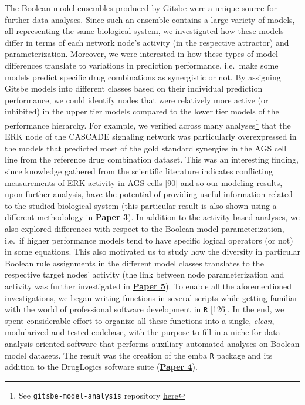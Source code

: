 \documentclass[
  12pt,
]{book}
\begin{document}
The Boolean model ensembles produced by Gitsbe were a unique source for further data analyses.
Since such an ensemble contains a large variety of models, all representing the same biological system, we investigated how these models differ in terms of each network node's activity (in the respective attractor) and parameterization.
Moreover, we were interested in how these types of model differences translate to variations in prediction performance, i.e.~make some models predict specific drug combinations as synergistic or not.
By assigning Gitsbe models into different classes based on their individual prediction performance, we could identify nodes that were relatively more active (or inhibited) in the upper tier models compared to the lower tier models of the performance hierarchy.
For example, we verified across many analyses\footnote{See \texttt{gitsbe-model-analysis} repository \protect\hyperlink{misc-links}{here}} that the ERK node of the CASCADE signaling network was particularly overexpressed in the models that predicted most of the gold standard synergies in the AGS cell line from the reference drug combination dataset.
This was an interesting finding, since knowledge gathered from the scientific literature indicates conflicting measurements of ERK activity in AGS cells {[}\protect\hyperlink{ref-Flobak2015}{90}{]} and so our modeling results, upon further analysis, have the potential of providing useful information related to the studied biological system (this particular result is also shown using a different methodology in \textbf{\protect\hyperlink{Paper3}{Paper 3}}).
In addition to the activity-based analyses, we also explored differences with respect to the Boolean model parameterization, i.e.~if higher performance models tend to have specific logical operators (or not) in some equations.
This also motivated us to study how the diversity in particular Boolean rule assignments in the different model classes translates to the respective target nodes' activity (the link between node parameterization and activity was further investigated in \textbf{\protect\hyperlink{Paper5}{Paper 5}}).
To enable all the aforementioned investigations, we began writing functions in several scripts while getting familiar with the world of professional software development in \texttt{R} {[}\protect\hyperlink{ref-Wickham2015}{126}{]}.
In the end, we spent considerable effort to organize all these functions into a single, \emph{clean}, modularized and tested codebase, with the purpose to fill in a niche for data analysis-oriented software that performs auxiliary automated analyses on Boolean model datasets.
The result was the creation of the emba \texttt{R} package and its addition to the DrugLogics software suite (\textbf{\protect\hyperlink{Paper4}{Paper 4}}).
\end{document}
